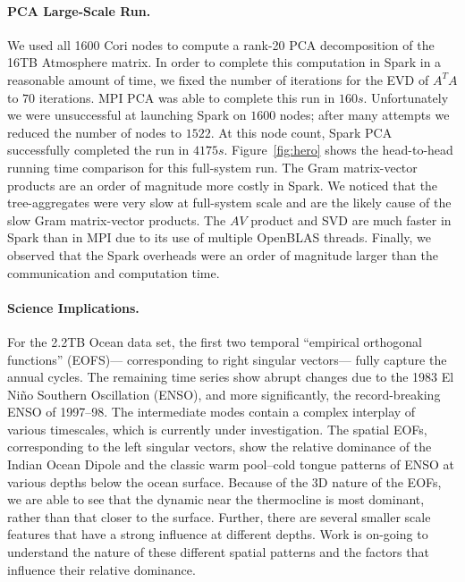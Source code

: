 \paragraph{PCA Large-Scale Run.}
We used all 1600 Cori nodes to compute a rank-20 PCA decomposition of the 16TB Atmosphere matrix. In order to complete this computation in Spark in a reasonable amount of time, we fixed the number of iterations for the EVD of $A^TA$ to $70$ iterations. MPI PCA was able to complete this run in $160s$. Unfortunately we were unsuccessful at launching Spark on $1600$ nodes; after many attempts we reduced the number of nodes to $1522$. At this node count, Spark PCA successfully completed the run in $4175s$. Figure~\ref{fig:hero} shows the head-to-head running time comparison for this full-system run. The Gram matrix-vector products are an order of magnitude more costly in Spark. We noticed that the tree-aggregates were very slow at full-system scale and are the likely cause of the slow Gram matrix-vector products. The $AV$ product and SVD are much faster in Spark than in MPI due to its use of multiple OpenBLAS threads. Finally, we observed that the Spark overheads were an order of magnitude larger than the communication and computation time.

\paragraph{Science Implications.}
For the 2.2TB Ocean data set, the first two temporal ``empirical orthogonal functions'' (EOFS)--- corresponding to right singular vectors--- fully capture the annual cycles. The remaining time series show abrupt changes due to the 1983 El Ni\~no Southern Oscillation (ENSO), and more significantly, the record-breaking ENSO of 1997--98. The intermediate modes contain a complex interplay of various timescales, which is currently under investigation. The spatial EOFs, corresponding to the left singular vectors, show the relative dominance of the Indian Ocean Dipole and the classic warm pool--cold tongue patterns of ENSO at various depths below the ocean surface. Because of the 3D nature of the EOFs, we are able to see that the dynamic near the thermocline is most dominant, rather than that closer to the surface. Further, there are several smaller scale features that have a strong influence at different depths. Work is on-going to understand the nature of these different spatial patterns and the factors that influence their relative dominance.
 

